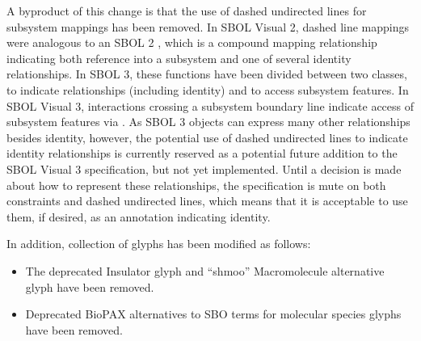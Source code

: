 A byproduct of this change is that the use of dashed undirected lines for subsystem mappings has been removed.
In SBOL Visual 2, dashed line mappings were analogous to an SBOL 2 , which is a compound mapping relationship indicating both reference into a subsystem and one of several identity relationships.
In SBOL 3, these functions have been divided between two classes,  to indicate relationships (including identity) and  to access subsystem features.
In SBOL Visual 3, interactions crossing a subsystem boundary line indicate access of subsystem features via .
As SBOL 3  objects can express many other relationships besides identity, however, the potential use of dashed undirected lines to indicate identity relationships is currently reserved as a potential future addition to the SBOL Visual 3 specification, but not yet implemented.
Until a decision is made about how to represent these relationships, the specification is mute on both constraints and dashed undirected lines, which means that it is acceptable to use them, if desired, as an annotation indicating identity.

In addition, collection of glyphs has been modified as follows:
\begin{itemize}
\item The deprecated Insulator glyph and ``shmoo'' Macromolecule alternative glyph have been removed.
\item Deprecated BioPAX alternatives to SBO terms for molecular species glyphs have been removed.
\end{itemize}

